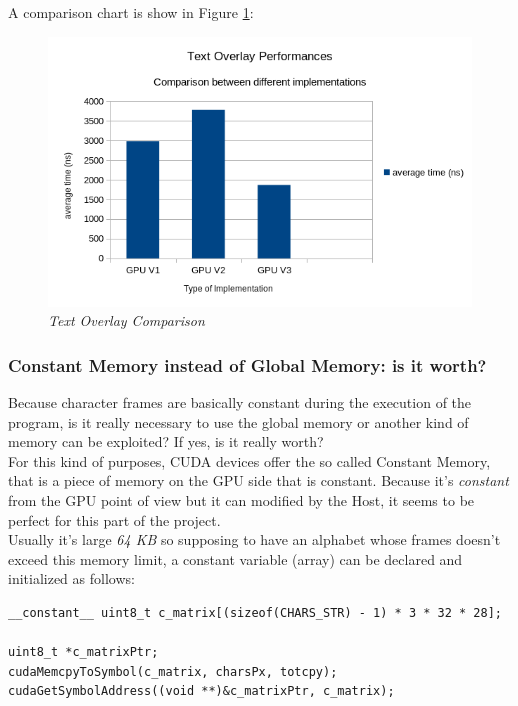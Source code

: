 \documentclass[paper=a4, fontsize=10pt]{scrartcl}	%
\begin{document}
	A comparison chart is show in Figure \ref{fig:chart9}:

	\begin{figure}[H]
		\centering
		\includegraphics[width=0.9\linewidth]{images/chart9.png}
		\caption{\textit{Text Overlay Comparison}}
		\label{fig:chart9}
	\end{figure}

	\subsubsection{Constant Memory instead of Global Memory: is it worth?}

	Because character frames are basically constant during the execution of the program, is it really necessary to use the global memory or another kind of memory can be exploited? If yes, is it really worth? \\

	For this kind of purposes, CUDA devices offer the so called Constant Memory, that is a piece of memory on the GPU side that is constant. Because it's \textit{constant} from the GPU point of view but it can modified by the Host, it seems to be perfect for this part of the project.\\

	Usually it's large \textit{64 KB} so supposing to have an alphabet whose frames doesn't exceed this memory limit, a constant variable (array) can be declared and initialized as follows:

	\begin{lstlisting}[style=CStyle]
__constant__ uint8_t c_matrix[(sizeof(CHARS_STR) - 1) * 3 * 32 * 28];

uint8_t *c_matrixPtr;
cudaMemcpyToSymbol(c_matrix, charsPx, totcpy);
cudaGetSymbolAddress((void **)&c_matrixPtr, c_matrix);
\end{lstlisting}
\end{document}
